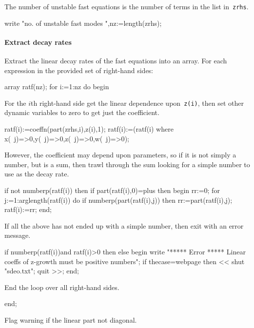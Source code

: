 \documentclass[11pt,a5paper]{article}
\begin{document}
The number of unstable fast equations is the number of terms in the list in~\verb|zrhs|.
\begin{reduce}
write "no. of unstable fast modes ",nz:=length(zrhs);
\end{reduce}

\paragraph{Extract decay rates}
Extract the linear decay rates of the fast equations into an array.
For each expression in the provided set of right-hand sides:
\begin{reduce}
array ratf(nz);
for i:=1:nz do begin
\end{reduce}

For the $i$th right-hand side get the linear dependence upon~\verb|z(i)|, then set other dynamic variables to zero to get just the coefficient.
\begin{reduce}
  ratf(i):=coeffn(part(zrhs,i),z(i),1);
  ratf(i):=(ratf(i) where {x(~j)=>0,y(~j)=>0,z(~j)=>0,w(~j)=>0});
\end{reduce}

However, the coefficient may depend upon parameters, so if it is not simply a number, but is a sum, then trawl through the sum looking for a simple number to use as the decay rate.
\begin{reduce}
  if not numberp(ratf(i)) then 
  if part(ratf(i),0)=plus then begin
    rr:=0;
    for j:=1:arglength(ratf(i)) do 
      if numberp(part(ratf(i),j)) 
      then rr:=part(ratf(i),j);
    ratf(i):=rr;
  end;
\end{reduce}

If all the above has not ended up with a simple number, then exit with an error message. 
\begin{reduce}
  if numberp(ratf(i))and ratf(i)>0 then
  else begin 
    write "***** Error *****
    Linear coeffs of z-growth must be positive numbers";
    if thecase=webpage then <<
      shut "sdeo.txt"; quit >>;
  end;
\end{reduce}

End the loop over all right-hand sides.
\begin{reduce}
end;
\end{reduce}

Flag warning if the linear part not diagonal.
\end{document}
